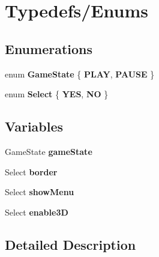\hypertarget{group___t_y_p_e_d_e_f_s}{\section{Typedefs/\-Enums}
\label{group___t_y_p_e_d_e_f_s}
}
\subsection*{Enumerations}
\begin{DoxyCompactItemize}
\item 
enum {\bfseries Game\-State} \{ {\bfseries P\-L\-A\-Y}, 
{\bfseries P\-A\-U\-S\-E}
 \}
\item 
enum {\bfseries Select} \{ {\bfseries Y\-E\-S}, 
{\bfseries N\-O}
 \}
\end{DoxyCompactItemize}
\subsection*{Variables}
\begin{DoxyCompactItemize}
\item 
\hypertarget{group___t_y_p_e_d_e_f_s_ga2706ed05d331ef3b53c728a6868bda26}{Game\-State {\bfseries game\-State}}\label{group___t_y_p_e_d_e_f_s_ga2706ed05d331ef3b53c728a6868bda26}

\item 
\hypertarget{group___t_y_p_e_d_e_f_s_gaedf00c9118f2afc5321a133ab13a771a}{Select {\bfseries border}}\label{group___t_y_p_e_d_e_f_s_gaedf00c9118f2afc5321a133ab13a771a}

\item 
\hypertarget{group___t_y_p_e_d_e_f_s_gab8182ca59816bb30f7ebe46b37615cf7}{Select {\bfseries show\-Menu}}\label{group___t_y_p_e_d_e_f_s_gab8182ca59816bb30f7ebe46b37615cf7}

\item 
\hypertarget{group___t_y_p_e_d_e_f_s_gacaced8dd742dbb5fa7e0e8bf6061e393}{Select {\bfseries enable3\-D}}\label{group___t_y_p_e_d_e_f_s_gacaced8dd742dbb5fa7e0e8bf6061e393}

\end{DoxyCompactItemize}


\subsection{Detailed Description}
